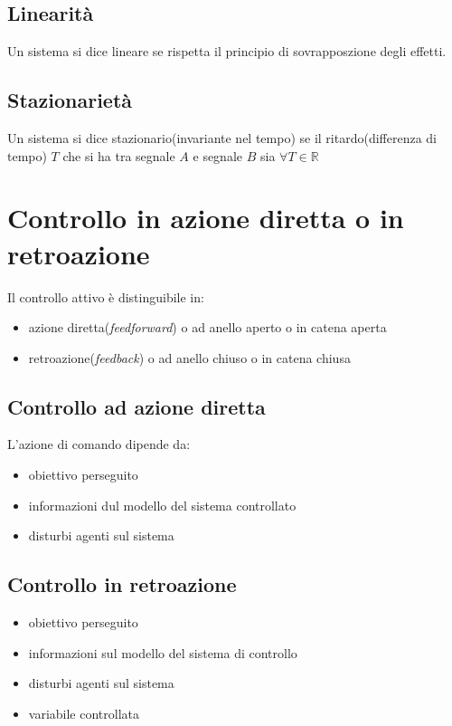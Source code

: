 \subsection{Linearit\`{a}}
Un sistema si dice lineare se rispetta il principio di sovrapposzione degli effetti.

\subsection{Stazionariet\`{a}}

Un sistema si dice stazionario(invariante nel tempo) se il ritardo(differenza di tempo) $T$ che si ha tra segnale $A$ e segnale 
$B$ sia $\forall T \in \mathbb{R}$


\section{Controllo in azione diretta o in retroazione}

Il controllo attivo \`{e} distinguibile in:
\begin{itemize}
  \item azione diretta(\textit{feedforward}) o ad anello aperto o in catena aperta
  \item retroazione(\textit{feedback}) o ad anello chiuso o in catena chiusa
\end{itemize}

\subsection{Controllo ad azione diretta}
L'azione di comando dipende da:
\begin{itemize}
  \item obiettivo perseguito
  \item informazioni dul modello del sistema controllato
  \item disturbi agenti sul sistema
\end{itemize}


\subsection{Controllo in retroazione}

\begin{itemize}
  \item obiettivo perseguito
  \item informazioni sul modello del sistema di controllo
  \item disturbi agenti sul sistema
  \item variabile controllata
\end{itemize}

